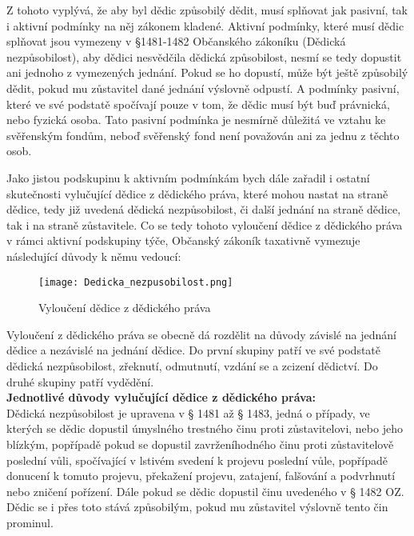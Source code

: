 \documentclass{article}
\begin{document}
Z tohoto vyplývá, že aby byl dědic způsobilý dědit, musí splňovat jak pasivní, tak i aktivní podmínky na něj zákonem kladené. Aktivní podmínky, které musí dědic splňovat jsou vymezeny v §1481-1482 Občanského zákoníku (Dědická nezpůsobilost), aby dědici nesvědčila dědická způsobilost, nesmí se tedy dopustit ani jednoho z vymezených jednání. Pokud se ho dopustí, může být ještě způsobilý dědit, pokud mu zůstavitel dané jednání výslovně odpustí. A podmínky pasivní, které ve své podstatě spočívají pouze v tom, že dědic musí být buď právnická, nebo fyzická osoba. Tato pasivní podmínka je nesmírně důležitá ve vztahu ke svěřenským fondům, neboď svěřenský fond není považován ani za jednu z těchto osob.\\

\newpage

Jako jistou podskupinu k aktivním podmínkám bych dále zařadil i ostatní skutečnosti vylučující dědice z dědického práva, které mohou nastat na straně dědice, tedy již uvedená dědická nezpůsobilost, či další jednání na straně dědice, tak i na straně zůstavitele. Co se tedy tohoto vyloučení dědice z dědického práva v rámci aktivní podskupiny týče, Občanský zákoník taxativně vymezuje následující důvody k němu vedoucí:

\begin{figure}[h]
\centering
\texttt{[image: Dedicka\_nezpusobilost.png]}
\caption[Vyloučení dědice z dědického práva]{Vyloučení dědice z dědického práva}
\label{fig:komparace}
\end{figure}

Vyloučení z dědického práva se obecně dá rozdělit na důvody závislé na jednání dědice a nezávislé na jednání dědice. Do první skupiny patří ve své podstatě dědická nezpůsobilost, zřeknutí, odmutnutí, vzdání se a zcizení dědictví. Do druhé skupiny patří vydědění. \\

\noindent\textbf{Jednotlivé důvody vylučující dědice z dědického práva:} \\

Dědická nezpůsobilost je upravena v § 1481 až § 1483, jedná o případy, ve kterých se dědic dopustil úmyslného trestného činu proti zůstavitelovi, nebo jeho blízkým, popřípadě pokud se dopustil zavrženíhodného činu proti zůstavitelově poslední vůli, spočívající v lstivém svedení k projevu poslední vůle, popřípadě donucení k tomuto projevu, překažení projevu, zatajení, falšování a podvrhnutí nebo zničení pořízení. Dále pokud se dědic dopustil činu uvedeného v § 1482 OZ. Dědic se i přes toto stává způsobilým, pokud mu zůstavitel výslovně tento čin prominul. \\
\end{document}
